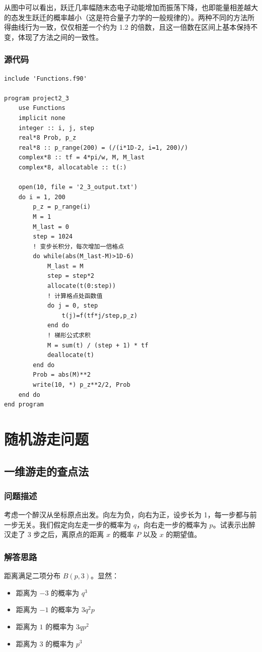 \documentclass{ctexart}
\begin{document}
从图中可以看出，跃迁几率幅随末态电子动能增加而振荡下降，也即能量相差越大的态发生跃迁的概率越小（这是符合量子力学的一般规律的）。两种不同的方法所得曲线行为一致，仅仅相差一个约为 1.2 的倍数，且这一倍数在区间上基本保持不变，体现了方法之间的一致性。
\subsubsection{源代码}
\begin{lstlisting}
include 'Functions.f90'

program project2_3
	use Functions
	implicit none
	integer :: i, j, step
	real*8 Prob, p_z
	real*8 :: p_range(200) = (/(i*1D-2, i=1, 200)/)
	complex*8 :: tf = 4*pi/w, M, M_last
	complex*8, allocatable :: t(:)

	open(10, file = '2_3_output.txt')
	do i = 1, 200
		p_z = p_range(i)
		M = 1
		M_last = 0
		step = 1024
		! 变步长积分，每次增加一倍格点
		do while(abs(M_last-M)>1D-6)
			M_last = M
			step = step*2
			allocate(t(0:step))
			! 计算格点处函数值
			do j = 0, step
				t(j)=f(tf*j/step,p_z)
			end do
			! 梯形公式求积
			M = sum(t) / (step + 1) * tf
			deallocate(t)
		end do
		Prob = abs(M)**2
		write(10, *) p_z**2/2, Prob
	end do
end program
\end{lstlisting}
\newpage
\section{随机游走问题}
\subsection{一维游走的查点法}
\subsubsection{问题描述}
考虑一个醉汉从坐标原点出发。向左为负，向右为正，设步长为 1，每一步都与前一步无关。我们假定向左走一步的概率为 $q$，向右走一步的概率为 $p$。试表示出醉汉走了 3 步之后，离原点的距离 $x$ 的概率 $P$ 以及 $x$ 的期望值。
\subsubsection{解答思路}
距离满足二项分布 $B(p,3)$。显然：
\begin{itemize}
    \item 距离为 $-3$ 的概率为 $q^3$
    \item 距离为 $-1$ 的概率为 $3q^2p$
    \item 距离为 $1$ 的概率为 $3qp^2$
    \item 距离为 $3$ 的概率为 $p^3$
\end{itemize}
\end{document}
